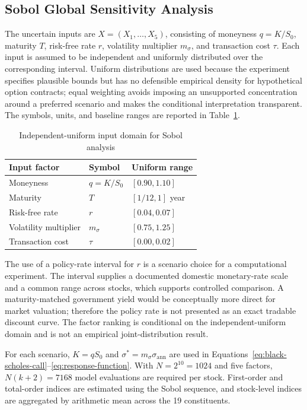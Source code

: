 \subsection{Sobol Global Sensitivity Analysis}
\label{subsec:sobol-method}

The uncertain inputs are $X=(X_1,\ldots,X_5)$, consisting of moneyness $q=K/S_0$, maturity $T$, risk-free rate $r$, volatility multiplier $m_\sigma$, and transaction cost $\tau$. Each input is assumed to be independent and uniformly distributed over the corresponding interval. Uniform distributions are used because the experiment specifies plausible bounds but has no defensible empirical density for hypothetical option contracts; equal weighting avoids imposing an unsupported concentration around a preferred scenario and makes the conditional interpretation transparent. The symbols, units, and baseline ranges are reported in Table~\ref{tab:sobol-input-ranges}.
\begin{table}[H]
  \centering
  \caption{Independent-uniform input domain for Sobol analysis}
  \label{tab:sobol-input-ranges}
  \begin{tabular}{lll}
    \toprule
    Input factor & Symbol & Uniform range \\
    \midrule
    Moneyness & $q=K/S_0$ & $[0.90,1.10]$ \\
    Maturity & $T$ & $[1/12,1]$ year \\
    Risk-free rate & $r$ & $[0.04,0.07]$ \\
    Volatility multiplier & $m_\sigma$ & $[0.75,1.25]$ \\
    Transaction cost & $\tau$ & $[0.00,0.02]$ \\
    \bottomrule
  \end{tabular}
\end{table}

The use of a policy-rate interval for $r$ is a scenario choice for a computational experiment. The interval supplies a documented domestic monetary-rate scale and a common range across stocks, which supports controlled comparison. A maturity-matched government yield would be conceptually more direct for market valuation; therefore the policy rate is not presented as an exact tradable discount curve. The factor ranking is conditional on the independent-uniform domain and is not an empirical joint-distribution result.

For each scenario, $K=qS_0$ and $\sigma^*=m_\sigma\sigma_{\mathrm{ann}}$ are used in Equations~\eqref{eq:black-scholes-call}--\eqref{eq:response-function}. With $N=2^{10}=1024$ and five factors, $N(k+2)=7168$ model evaluations are required per stock. First-order and total-order indices are estimated using the Sobol sequence, and stock-level indices are aggregated by arithmetic mean across the 19 constituents.

